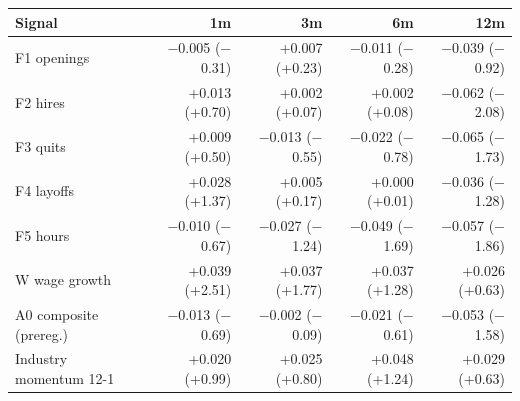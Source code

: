 \begin{tabular}{lrrrr}
\toprule
Signal & 1m & 3m & 6m & 12m \\
\midrule
F1 openings & $-$0.005 ($-$0.31) & +0.007 (+0.23) & $-$0.011 ($-$0.28) & $-$0.039 ($-$0.92) \\
F2 hires & +0.013 (+0.70) & +0.002 (+0.07) & +0.002 (+0.08) & $-$0.062 ($-$2.08) \\
F3 quits & +0.009 (+0.50) & $-$0.013 ($-$0.55) & $-$0.022 ($-$0.78) & $-$0.065 ($-$1.73) \\
F4 layoffs & +0.028 (+1.37) & +0.005 (+0.17) & +0.000 (+0.01) & $-$0.036 ($-$1.28) \\
F5 hours & $-$0.010 ($-$0.67) & $-$0.027 ($-$1.24) & $-$0.049 ($-$1.69) & $-$0.057 ($-$1.86) \\
W wage growth & +0.039 (+2.51) & +0.037 (+1.77) & +0.037 (+1.28) & +0.026 (+0.63) \\
A0 composite (prereg.) & $-$0.013 ($-$0.69) & $-$0.002 ($-$0.09) & $-$0.021 ($-$0.61) & $-$0.053 ($-$1.58) \\
Industry momentum 12-1 & +0.020 (+0.99) & +0.025 (+0.80) & +0.048 (+1.24) & +0.029 (+0.63) \\
\bottomrule
\end{tabular}
